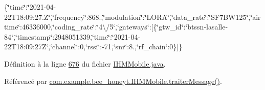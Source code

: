 \{\char`\"{}time\char`\"{}\+:\char`\"{}2021-\/04-\/22\+T18\+:09\+:27.\+Z\char`\"{},\char`\"{}frequency\char`\"{}\+:868.,\char`\"{}modulation\char`\"{}\+:\char`\"{}\+L\+O\+R\+A\char`\"{},\char`\"{}data\+\_\+rate\char`\"{}\+:\char`\"{}\+S\+F7\+B\+W125\char`\"{},\char`\"{}airtime\char`\"{}\+:46336000,\char`\"{}coding\+\_\+rate\char`\"{}\+:\char`\"{}4\textbackslash{}/5\char`\"{},\char`\"{}gateways\char`\"{}\+:\mbox{[}\{\char`\"{}gtw\+\_\+id\char`\"{}\+:\char`\"{}btssn-\/lasalle-\/84\char`\"{},\char`\"{}timestamp\char`\"{}\+:2948051339,\char`\"{}time\char`\"{}\+:\char`\"{}2021-\/04-\/22\+T18\+:09\+:27\+Z\char`\"{},\char`\"{}channel\char`\"{}\+:0,\char`\"{}rssi\char`\"{}\+:-\/71,\char`\"{}snr\char`\"{}\+:8.,\char`\"{}rf\+\_\+chain\char`\"{}\+:0\}\mbox{]}\}

Définition à la ligne \hyperlink{_i_h_m_mobile_8java_source_l00676}{676} du fichier \hyperlink{_i_h_m_mobile_8java_source}{I\+H\+M\+Mobile.\+java}.



Référencé par \hyperlink{_i_h_m_mobile_8java_source_l00374}{com.\+example.\+bee\+\_\+honeyt.\+I\+H\+M\+Mobile.\+traiter\+Message()}.


